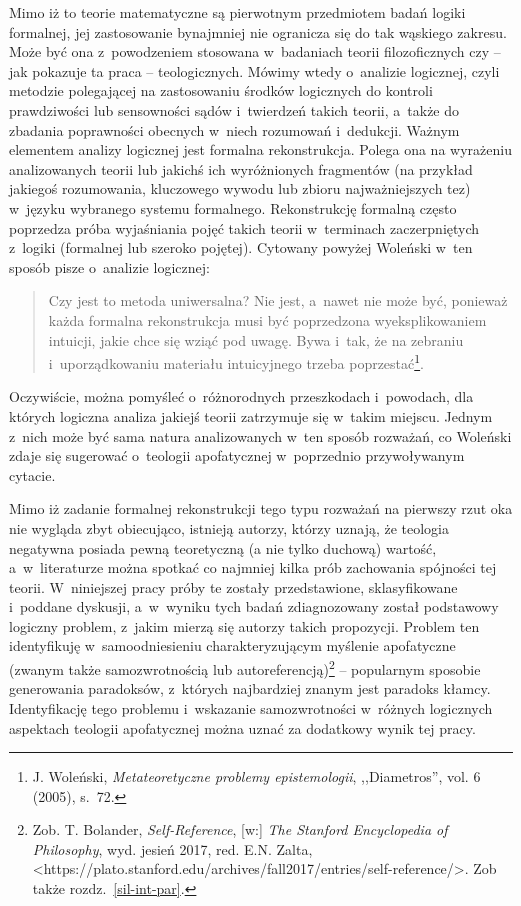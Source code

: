 Mimo iż to teorie matematyczne są pierwotnym przedmiotem badań logiki formalnej, jej zastosowanie bynajmniej nie ogranicza się do tak wąskiego zakresu. Może być ona z~powodzeniem stosowana w~badaniach teorii filozoficznych czy -- jak pokazuje ta praca -- teologicznych. Mówimy wtedy o~analizie logicznej, czyli metodzie polegającej na zastosowaniu środków logicznych do kontroli prawdziwości lub sensowności sądów i~twierdzeń takich teorii, a~także do zbadania poprawności obecnych w~niech rozumowań i~dedukcji. Ważnym elementem analizy logicznej jest formalna rekonstrukcja. Polega ona na wyrażeniu analizowanych teorii lub jakichś ich wyróżnionych fragmentów (na przykład jakiegoś rozumowania, kluczowego wywodu lub zbioru najważniejszych tez) w~języku wybranego systemu formalnego. Rekonstrukcję formalną często poprzedza próba wyjaśniania pojęć takich teorii w~terminach zaczerpniętych z~logiki (formalnej lub szeroko pojętej). Cytowany powyżej Woleński w~ten sposób pisze o~analizie logicznej:

\begin{quote}
Czy jest to metoda uniwersalna? Nie jest, a~nawet nie może być, ponieważ każda formalna rekonstrukcja musi być poprzedzona wyeksplikowaniem intuicji, jakie chce się wziąć pod uwagę. Bywa i~tak, że na zebraniu i~uporządkowaniu materiału intui\-cyjnego trzeba poprzestać\footnote{J. Woleński, \textit{Metateoretyczne problemy epistemologii}, ,,Diametros'', vol. 6 (2005), s.~72.}.
\end{quote}
Oczywiście, można pomyśleć o~różnorodnych przeszkodach i~powodach, dla których logiczna analiza jakiejś teorii zatrzymuje się w~takim miejscu. Jednym z~nich może być sama natura analizowanych w~ten sposób rozważań, co Woleński zdaje się sugerować o~teologii apofatycznej w~poprzednio przywoływanym cytacie.

Mimo iż zadanie formalnej rekonstrukcji tego typu rozważań na pierwszy rzut oka nie wygląda zbyt obiecująco, istnieją autorzy, którzy uznają, że teologia negatywna posiada pewną teoretyczną (a nie tylko duchową) wartość, a~w~literaturze można spotkać co najmniej kilka prób zachowania spójności tej teorii. W~niniejszej pracy próby te zostały przedstawione, sklasyfikowane i~poddane dyskusji, a~w~wyniku tych badań zdiagnozowany został podstawowy logiczny problem, z~jakim mierzą się autorzy takich propozycji. Problem ten identyfikuję w~samoodniesieniu charakteryzującym myślenie apofatyczne (zwanym także samozwrotnością lub autoreferencją)\footnote{Zob. T. Bolander, \textit{Self-Reference}, [w:] \textit{The Stanford Encyclopedia of Philosophy}, wyd. jesień 2017, red. E.N. Zalta, {\textless}https://plato.stanford.edu/archives/fall2017/entries/self-reference/{\textgreater}. Zob także rozdz.~\ref{sil-int-par}.} -- popularnym sposobie generowania paradoksów, z~których najbardziej znanym jest paradoks kłamcy. Identyfikację tego problemu i~wskazanie samozwrotności w~różnych logicznych aspektach teologii apofatycznej można uznać za dodatkowy wynik tej pracy.

